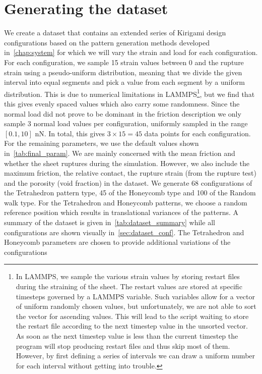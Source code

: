 \section{Generating the dataset}
We create a dataset that contains an extended series of Kirigami design
configurations based on the pattern generation methods developed
in~\cref{chap:system} for which we will vary the strain and load for each
configuration. For each configuration, we sample 15 strain values between 0 and
the rupture strain using a pseudo-uniform distribution, meaning that we divide
the given interval into equal segments and pick a value from each segment by a
uniform distribution. This is due to numerical limitations in LAMMPS\footnote{In
LAMMPS, we sample the various strain values by storing restart files during the
straining of the sheet. The restart values are stored at specific timesteps
governed by a LAMMPS variable. Such variables allow for a vector of uniform
randomly chosen values, but unfortunately, we are not able to sort the vector
for ascending values. This will lead to the script waiting to store the restart
file according to the next timestep value in the unsorted vector. As soon as the next
timestep value is less than the current timestep the program will stop producing
restart files and thus skip most of them. However, by first defining a series of
intervals we can draw a uniform number for each interval without getting into
trouble.}, but we find that this gives evenly spaced values which also carry
some randomness. Since the normal load did not prove to be dominant in the
friction description we only sample 3 normal load values per configuration,
uniformly sampled in the range $[0.1, 10]$ nN. In total, this gives $3\times 15
= 45$ data points for each configuration. For the remaining parameters, we use
the default values shown in~\cref{tab:final_param}. We are mainly concerned with
the mean friction and whether the sheet ruptures during the simulation. However,
we also include the maximum friction, the relative contact, the rupture strain
(from the rupture test) and the porosity (void fraction) in the dataset. We
generate 68 configurations of the Tetrahedron pattern type, 45 of the Honeycomb
type and 100 of the Random walk type. For the Tetrahedron and Honeycomb
patterns, we choose a random reference position which results in translational
variances of the patterns. A summary of the dataset is given
in~\cref{tab:dataset_summary} while all configurations are shown visually
in~\cref{sec:dataset_conf}. The Tetrahedron and Honeycomb
parameters are chosen to provide additional variations of the configurations
